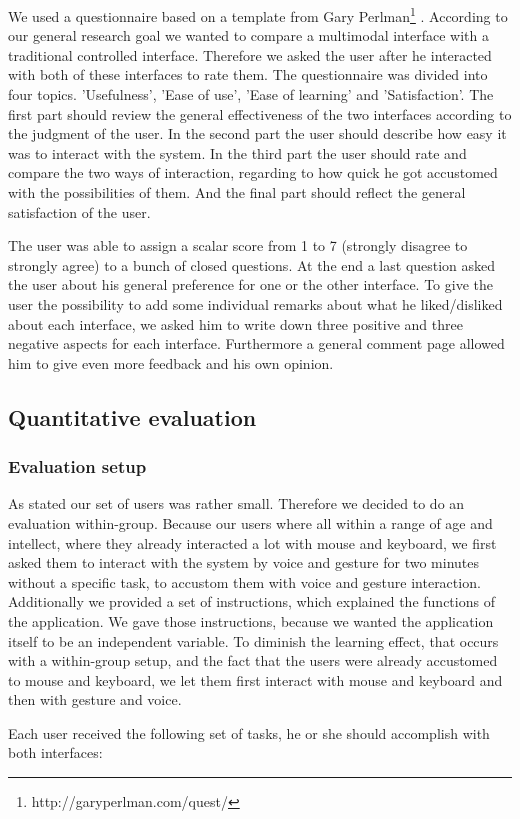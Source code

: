 \documentclass[a4paper, 10pt]{article}
\begin{document}
	\par{We used a questionnaire based on a template from Gary Perlman\footnote{http://garyperlman.com/quest/} . According to our general research goal we wanted to compare a multimodal interface with a traditional controlled interface. Therefore we asked the user after he interacted with both of these interfaces to rate them. The questionnaire was divided into four topics. 'Usefulness', 'Ease of use', 'Ease of learning' and 'Satisfaction'. The first part should review the general effectiveness of the two interfaces according to the judgment of the user. In the second part the user should describe how easy it was to interact with the system. In the third part the user should rate and compare the two ways of interaction, regarding to how quick he got accustomed with the possibilities of them. And the final part should reflect the general satisfaction of the user.}
	\par{The user was able to assign a scalar score from 1 to 7 (strongly disagree to strongly agree) to a bunch of closed questions. At the end a last question asked the user about his general preference for one or the other interface. To give the user the possibility to add some individual remarks about what he liked/disliked about each interface, we asked him to write down three positive and three negative aspects for each interface. Furthermore a general comment page allowed him to give even more feedback and his own opinion.}
	
	\subsection{Quantitative evaluation}
	
	\subsubsection{Evaluation setup}
	
	\par{As stated our set of users was rather small. Therefore we decided to do an evaluation within-group. Because our users where all within a range of age and intellect, where they already interacted a lot with mouse and keyboard, we first asked them to interact with the system by voice and gesture for two minutes without a specific task, to accustom them with voice and gesture interaction. Additionally we provided a set of instructions, which explained the functions of the application. We gave those instructions, because we wanted the application itself to be an independent variable. To diminish the learning effect, that occurs with a within-group setup, and the fact that the users were already accustomed to mouse and keyboard, we let them first interact with mouse and keyboard and then with gesture and voice.}
	\par{Each user received the following set of tasks, he or she should accomplish with both interfaces:}
	
\end{document}
